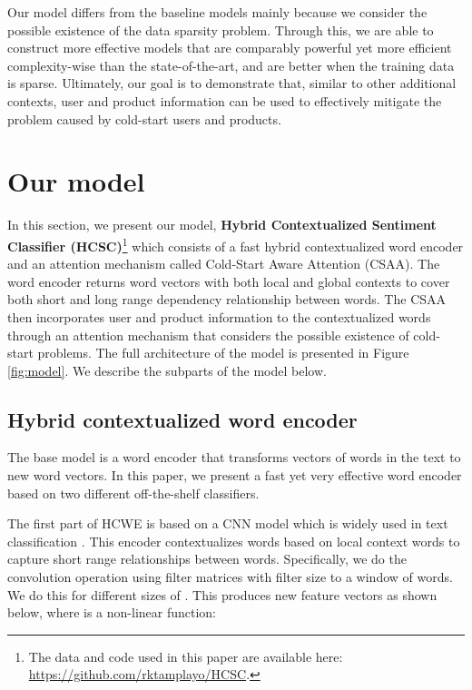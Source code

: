 \documentclass[11pt,a4paper]{article}
\begin{document}
Our model differs from the baseline models mainly because we consider the possible existence of the data sparsity problem. Through this, we are able to construct more effective models that are comparably powerful yet more efficient complexity-wise than the state-of-the-art, and are better when the training data is sparse. Ultimately, our goal is to demonstrate that, similar to other additional contexts, user and product information can be used to effectively mitigate the problem caused by cold-start users and products.

\section{Our model}

In this section, we present our model, \textbf{Hybrid Contextualized Sentiment Classifier (HCSC)}\footnote{The data and code used in this paper are available here: \url{https://github.com/rktamplayo/HCSC}.} which consists of a fast hybrid contextualized word encoder and an attention mechanism called Cold-Start Aware Attention (CSAA).
The word encoder returns word vectors with both local and global contexts to cover both short and long range dependency relationship between words.
The CSAA then incorporates user and product information to the contextualized words through an attention mechanism that considers the possible existence of cold-start problems.
The full architecture of the model is presented in Figure \ref{fig:model}. We describe the subparts of the model below.

\subsection{Hybrid contextualized word encoder}

The base model is a word encoder that transforms vectors of words  in the text to new word vectors.
In this paper, we present a fast yet very effective word encoder based on two different off-the-shelf classifiers.



The first part of HCWE is based on a CNN model which is widely used in text classification \cite{Kim2014ConvolutionalNN}. This encoder contextualizes words based on local context words to capture short range relationships between words.
Specifically, we do the convolution operation using filter matrices  with filter size  to a window of  words. We do this for different sizes of . This produces new feature vectors  as shown below, where  is a non-linear function:
\end{document}
